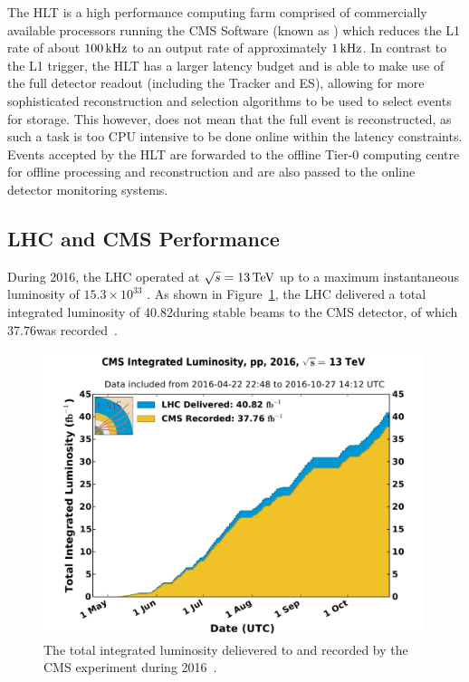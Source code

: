 The HLT is a high performance computing farm comprised of commercially available processors running the CMS Software (known as \CMSSW) which reduces the L1 rate of about $100\text{\,kHz}$ to an output rate of approximately $1\text{\,kHz}$.
In contrast to the L1 trigger, the HLT has a larger latency budget and is able to make use of the full detector readout (including the Tracker and ES), allowing for more sophisticated reconstruction and selection algorithms to be used to select events for storage.
This however, does not mean that the full event is reconstructed, as such a task is too CPU intensive to be done online within the latency constraints.
Events accepted by the HLT are forwarded to the offline Tier-0 computing centre for offline processing and reconstruction and are also passed to the online detector monitoring systems.

\subsection{LHC and CMS Performance}\label{subsec:Lumi}
During 2016, the LHC operated at $\sqrt{s} = 13\,\text{Te\hspace{-.08em}V}$ up to a maximum instantaneous luminosity of $15.3 \times 10^{33}$ \percms.
As shown in Figure~\ref{fig:cms_lumi}, the LHC delivered a total integrated luminosity of 40.82\fbinv during stable beams to the CMS detector, of which 37.76\fbinv was recorded~\cite{cmsLumiPage,CMS:2017_lumi}.
\begin{figure}[htbp]
\begin{center}
\includegraphics[width=0.99\textwidth]{figs/lhc/int_lumi_per_day_cumulative_pp_2016.pdf}
\caption{The total integrated luminosity delievered to and recorded by the CMS experiment during 2016~\cite{CMS:2017_lumi}.}
\label{fig:cms_lumi}
\end{center}
\end{figure}

